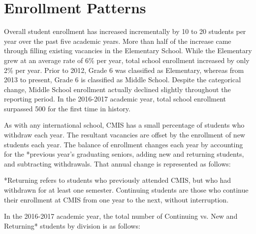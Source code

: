 \section{Enrollment Patterns}


Overall student enrollment has increased incrementally by 10 to 20 students per year over the past five academic years.  More than half of the increase came through filling existing vacancies in the Elementary School.  While the Elementary grew at an average rate of 6\% per year, total school enrollment increased by only 2\% per year.  Prior to 2012, Grade 6 was classified as Elementary, whereas from 2013 to present, Grade 6 is classified as Middle School.  Despite the categorical change, Middle School enrollment actually declined slightly throughout the reporting period.  In the 2016-2017 academic year, total school enrollment surpassed 500 for the first time in history.  

As with any international school, CMIS has a small percentage of students who withdraw each year. The resultant vacancies are offset by the enrollment of new students each year.  The balance of enrollment changes each year by accounting for the *previous year’s graduating seniors, adding new and returning students, and subtracting withdrawals.  That annual change is represented as follows:




*Returning refers to students who previously attended CMIS, but who had withdrawn for at least one semester.  Continuing students are those who continue their enrollment at CMIS from one year to the next, without interruption.  

In the 2016-2017 academic year, the total number of Continuing vs. New and Returning* students by division is as follows:

